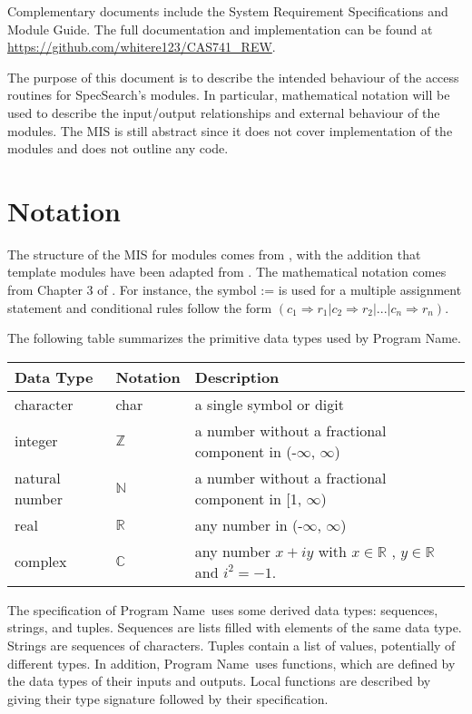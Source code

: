 \documentclass[12pt, titlepage]{article}
\newcommand{\progname}{Program Name}
\begin{document}
Complementary documents include the System Requirement Specifications
and Module Guide.  The full documentation and implementation can be
found at \url{https://github.com/whitere123/CAS741_REW}.

The purpose of this document is to describe the intended behaviour of the 
access routines for SpecSearch's modules. In particular, mathematical notation 
will be used to describe the input/output relationships and external behaviour 
of the 
modules. The MIS is still abstract since it does not cover implementation of 
the modules and does not outline any code.  
\section{Notation}

The structure of the MIS for modules comes from \citet{HoffmanAndStrooper1995},
with the addition that template modules have been adapted from
\cite{GhezziEtAl2003}.  The mathematical notation comes from Chapter 3 of
\citet{HoffmanAndStrooper1995}.  For instance, the symbol := is used for a
multiple assignment statement and conditional rules follow the form $(c_1
\Rightarrow r_1 | c_2 \Rightarrow r_2 | ... | c_n \Rightarrow r_n )$.

The following table summarizes the primitive data types used by \progname. 

\begin{center}
\renewcommand{\arraystretch}{1.2}
\noindent 
\begin{tabular}{l l p{7.5cm}} 
\toprule 
\textbf{Data Type} & \textbf{Notation} & \textbf{Description}\\ 
\midrule
character & char & a single symbol or digit\\
integer & $\mathbb{Z}$ & a number without a fractional component in (-$\infty$, $\infty$) \\
natural number & $\mathbb{N}$ & a number without a fractional component in [1, $\infty$) \\
real & $\mathbb{R}$ & any number in (-$\infty$, $\infty$)\\
complex & $\mathbb{C}$ &any number $x + iy$ with $x \in \mathbb{R}$ , $y \in 
\mathbb{R}$ and $i^{2} = -1$. \\
\bottomrule
\end{tabular} 
\end{center}

\noindent
The specification of \progname \ uses some derived data types: sequences, strings, and
tuples. Sequences are lists filled with elements of the same data type. Strings
are sequences of characters. Tuples contain a list of values, potentially of
different types. In addition, \progname \ uses functions, which
are defined by the data types of their inputs and outputs. Local functions are
described by giving their type signature followed by their specification.
\end{document}
